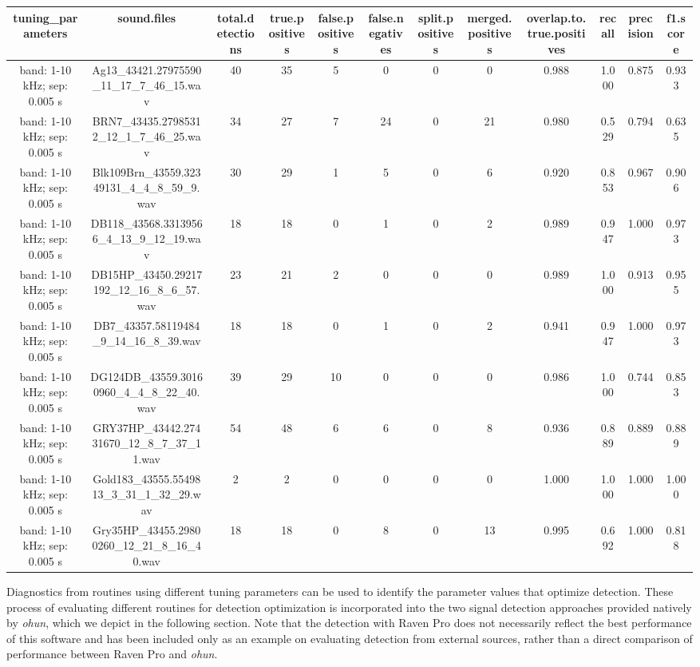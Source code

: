 \documentclass[
]{article}
\begin{document}
\begin{table}
\centering
\begin{tabular}[t]{c|c|c|c|c|c|c|c|c|c|c|c}
\hline
tuning\_parameters & sound.files & total.detections & true.positives & false.positives & false.negatives & split.positives & merged.positives & overlap.to.true.positives & recall & precision & f1.score\\
\hline
band: 1-10 kHz; sep: 0.005 s & Ag13\_43421.27975590\_11\_17\_7\_46\_15.wav & 40 & 35 & 5 & 0 & 0 & 0 & 0.988 & 1.000 & 0.875 & 0.933\\
\hline
band: 1-10 kHz; sep: 0.005 s & BRN7\_43435.27985312\_12\_1\_7\_46\_25.wav & 34 & 27 & 7 & 24 & 0 & 21 & 0.980 & 0.529 & 0.794 & 0.635\\
\hline
band: 1-10 kHz; sep: 0.005 s & Blk109Brn\_43559.32349131\_4\_4\_8\_59\_9.wav & 30 & 29 & 1 & 5 & 0 & 6 & 0.920 & 0.853 & 0.967 & 0.906\\
\hline
band: 1-10 kHz; sep: 0.005 s & DB118\_43568.33139566\_4\_13\_9\_12\_19.wav & 18 & 18 & 0 & 1 & 0 & 2 & 0.989 & 0.947 & 1.000 & 0.973\\
\hline
band: 1-10 kHz; sep: 0.005 s & DB15HP\_43450.29217192\_12\_16\_8\_6\_57.wav & 23 & 21 & 2 & 0 & 0 & 0 & 0.989 & 1.000 & 0.913 & 0.955\\
\hline
band: 1-10 kHz; sep: 0.005 s & DB7\_43357.58119484\_9\_14\_16\_8\_39.wav & 18 & 18 & 0 & 1 & 0 & 2 & 0.941 & 0.947 & 1.000 & 0.973\\
\hline
band: 1-10 kHz; sep: 0.005 s & DG124DB\_43559.30160960\_4\_4\_8\_22\_40.wav & 39 & 29 & 10 & 0 & 0 & 0 & 0.986 & 1.000 & 0.744 & 0.853\\
\hline
band: 1-10 kHz; sep: 0.005 s & GRY37HP\_43442.27431670\_12\_8\_7\_37\_11.wav & 54 & 48 & 6 & 6 & 0 & 8 & 0.936 & 0.889 & 0.889 & 0.889\\
\hline
band: 1-10 kHz; sep: 0.005 s & Gold183\_43555.5549813\_3\_31\_1\_32\_29.wav & 2 & 2 & 0 & 0 & 0 & 0 & 1.000 & 1.000 & 1.000 & 1.000\\
\hline
band: 1-10 kHz; sep: 0.005 s & Gry35HP\_43455.29800260\_12\_21\_8\_16\_40.wav & 18 & 18 & 0 & 8 & 0 & 13 & 0.995 & 0.692 & 1.000 & 0.818\\
\hline
\end{tabular}
\end{table}

Diagnostics from routines using different tuning parameters can be used
to identify the parameter values that optimize detection. These process
of evaluating different routines for detection optimization is
incorporated into the two signal detection approaches provided natively
by \emph{ohun}, which we depict in the following section. Note that the
detection with Raven Pro does not necessarily reflect the best
performance of this software and has been included only as an example on
evaluating detection from external sources, rather than a direct
comparison of performance between Raven Pro and \emph{ohun}.
\end{document}
